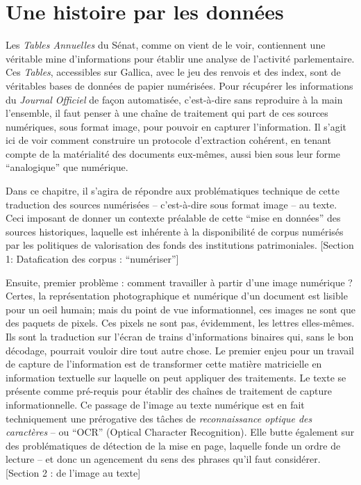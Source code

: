 \chapter{Une histoire par les données}

Les \emph{Tables Annuelles} du Sénat, comme on vient de le voir, contiennent une véritable mine d'informations pour établir une analyse de l'activité parlementaire. Ces \emph{Tables}, accessibles sur Gallica, avec le jeu des renvois et des index, sont de véritables bases de données de papier numérisées. Pour récupérer les informations du \emph{Journal Officiel} de façon automatisée, c'est-à-dire sans reproduire à la main l'ensemble, il faut penser à une chaîne de traitement qui part de ces sources numériques, sous format image, pour pouvoir en capturer l'information. Il s'agit ici de voir comment construire un protocole d’extraction cohérent, en tenant compte de la matérialité des documents eux-mêmes, aussi bien sous leur forme \enquote{analogique} que numérique. 

Dans ce chapitre, il s'agira de répondre aux problématiques technique de cette traduction des sources numérisées -- c'est-à-dire sous format image -- au texte. Ceci imposant de donner un contexte préalable de cette \enquote{mise en données} des sources historiques, laquelle est inhérente à la disponibilité de corpus numérisés par les politiques de valorisation des fonds des institutions patrimoniales. [Section 1: Datafication des corpus : \enquote{numériser}]

Ensuite, premier problème : comment travailler à partir d'une image numérique ? Certes, la représentation photographique et numérique d'un document est lisible pour un oeil humain; mais du point de vue informationnel, ces images ne sont que des paquets de pixels. Ces pixels ne sont pas, évidemment, les lettres elles-mêmes. Ils sont la traduction sur l'écran de trains d'informations binaires qui, sans le bon décodage, pourrait vouloir dire tout autre chose. Le premier enjeu pour un travail de capture de l'information est de transformer cette matière matricielle en information textuelle sur laquelle on peut appliquer des traitements. Le texte se présente comme pré-requis pour établir des chaînes de traitement de capture informationnelle. Ce passage de l'image au texte numérique est en fait techniquement une prérogative des tâches de \emph{reconnaissance optique des caractères} -- ou \enquote{OCR} (Optical Character Recognition). Elle butte également sur des problématiques de détection de la mise en page, laquelle fonde un ordre de lecture -- et donc un agencement du sens des phrases qu'il faut considérer. [Section 2 : de l'image au texte]


